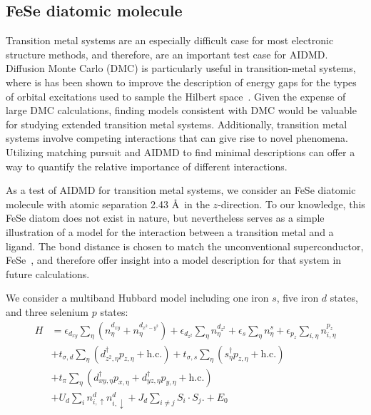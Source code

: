\subsection{FeSe diatomic molecule}
\label{subsection:fese}
Transition metal systems are an especially difficult case for most electronic structure methods, and therefore, are an 
important test case for AIDMD. 
Diffusion Monte Carlo (DMC) is particularly useful in transition-metal systems, where is has been shown to improve the description of energy gaps for the types of orbital excitations used to sample the Hilbert space~\cite{lucas}.
Given the expense of large DMC calculations, finding models consistent with DMC would be valuable for studying extended transition metal systems. Additionally, transition metal systems involve competing interactions that can give rise to novel phenomena. 
Utilizing matching pursuit and AIDMD to find minimal descriptions can offer a way to quantify the relative importance of different interactions.

As a test of AIDMD for transition metal systems, we consider an FeSe diatomic molecule with atomic separation 2.43 \AA~in the $z$-direction.
To our knowledge, this FeSe diatom does not exist in nature, but nevertheless serves as a simple illustration of a model for the interaction between a transition metal and a ligand. The bond distance is chosen to match the unconventional superconductor, FeSe~\cite{fese}, and therefore offer insight into a model description for that system in future calculations.

We consider a multiband Hubbard model including one iron $s$, five iron $d$ states, and three selenium $p$ states:
\begin{align*}
  H 
  &=
  \epsilon_{d_{xy}} \sum_{\eta} (n^{d_{xy}}_{\eta}  + n^{d_{x^2-y^2}}_{\eta})
  +
  \epsilon_{d_{z^2}} \sum_{\eta} n^{d_{z^2}}_{\eta} 
  +
  \epsilon_s \sum_{\eta} n^{s}_{\eta} 
  +
  \epsilon_{p_{z}} \sum_{i,\eta} n^{p_{z}}_{i,\eta} 
  \\
  &+ 
  t_{\sigma,d} \sum_{\eta} \left( d_{z^2,\eta}^{\dagger} p_{z,\eta} + \text{h.c.} \right)
  +
  t_{\sigma,s} \sum_{\eta} \left(s_{\eta}^{\dagger}  p_{z,\eta} + \text{h.c.} \right)
  \\
  &+ 
  t_{\pi} \sum_{\eta} \left( d_{xy,\eta}^{\dagger} p_{x,\eta} + d_{yz,\eta}^{\dagger}  p_{y,\eta} + \text{h.c.} \right)
  \\
  &+
  U_d \sum_{i} n^{d}_{i,\uparrow} n^{d}_{i,\downarrow} 
  +
  J_d \sum_{i\ne j} S_i \cdot S_j.
  +
  E_0
\end{align*}

